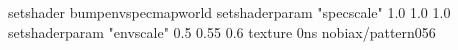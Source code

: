 setshader bumpenvspecmapworld
setshaderparam "specscale" 1.0 1.0 1.0
setshaderparam "envscale"  0.5 0.55 0.6
texture 0ns nobiax/pattern056